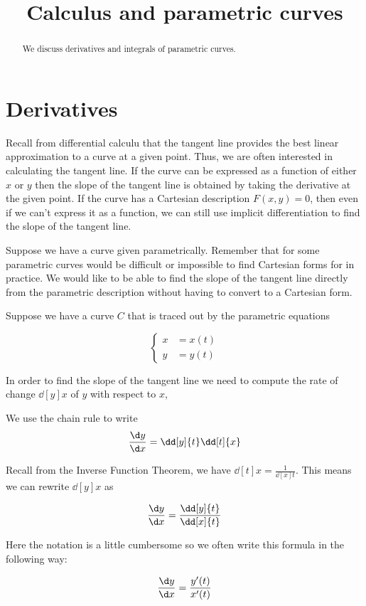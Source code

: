 \documentclass{ximera}
\title[Dig-In:]{Calculus and parametric curves}
\begin{document}
\begin{abstract}
  We discuss derivatives and integrals of parametric curves.  
\end{abstract}
\maketitle

\section{Derivatives}

Recall from differential calculu that the tangent line provides the best linear approximation to a curve at a given point. Thus, we are often interested in calculating the tangent line.   If the curve can be expressed as a function of either $x$ or $y$ then the slope of the tangent line is obtained by taking the derivative at the given point. If the curve has a Cartesian description $F(x,y)=0$, then even if we can't express it as a function, we can still use implicit differentiation to find the slope of the tangent line. 

Suppose we have a curve given parametrically. Remember that for some parametric curves would be difficult or impossible to find Cartesian forms for in practice. We would like to be able to find the slope of the tangent line directly from the parametric description without having to convert to a Cartesian form.


Suppose we have a curve $C$ that is traced out by the parametric equations 

\[ 
\begin{cases}
x&=x(t) \\
y&=y(t)
\end{cases}
\]

In order to find the slope of the tangent line we need to compute the rate of change  $\dd[y]{x}$ of $y$ with respect to $x$,

We use the chain rule to write 
\[
\frac{\d y}{\d x} = \dd[y]{t} \dd[t]{x}
\]

Recall from the Inverse Function Theorem, we have $\dd[t]{x}=\frac{1}{\dd[x]{t}}$. This means we can rewrite $\dd[y]{x}$ as 

\[
\frac{\d y}{\d x} = \frac{\dd[y]{t}}{ \dd[x]{t}}
\]

Here the notation is a little cumbersome so we often write this formula in the following way:

\[
\frac{\d y}{\d x} = \frac{ y'(t)}{x'(t)}
\]
\end{document}
